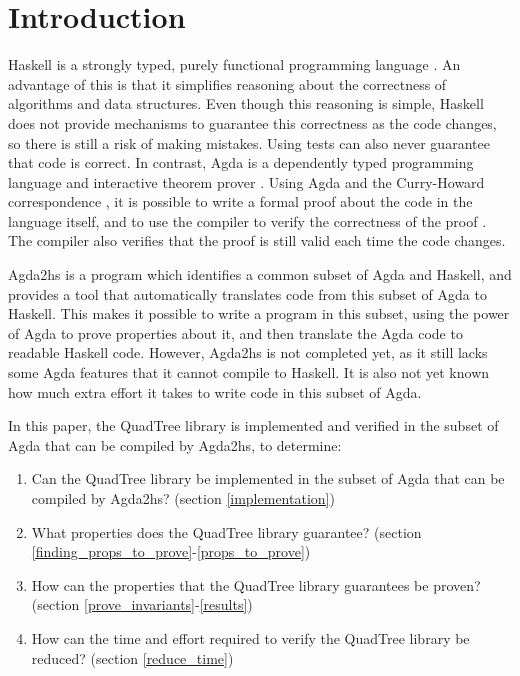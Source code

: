 \section{Introduction}
Haskell is a strongly typed, purely functional programming language \cite{haskell}. An advantage of this is that it simplifies reasoning about the correctness of algorithms and data structures. Even though this reasoning is simple, Haskell does not provide mechanisms to guarantee this correctness as the code changes, so there is still a risk of making mistakes. Using tests can also never guarantee that code is correct. In contrast, Agda is a dependently typed programming language and interactive theorem prover \cite{agda}. Using Agda and the Curry-Howard correspondence \cite{chc}, it is possible to write a formal proof about the code in the language itself, and to use the compiler to verify the correctness of the proof \cite{schwaab, van}. The compiler also verifies that the proof is still valid each time the code changes.

Agda2hs \cite{agda2hs} is a program which identifies a common subset of Agda and Haskell, and provides a tool that automatically translates code from this subset of Agda to Haskell. This makes it possible to write a program in this subset, using the power of Agda to prove properties about it, and then translate the Agda code to readable Haskell code. However, Agda2hs is not completed yet, as it still lacks some Agda features that it cannot compile to Haskell. It is also not yet known how much extra effort it takes to write code in this subset of Agda.

In this paper, the QuadTree library is implemented and verified in the subset of Agda that can be compiled by Agda2hs, to determine:
\begin{enumerate}[label=(\roman*)]
	\itemsep-0.2em 
	\item Can the QuadTree library be implemented in the subset of Agda that can be compiled by Agda2hs? (section \ref{implementation})
	\item What properties does the QuadTree library guarantee? (section \ref{finding_props_to_prove}-\ref{props_to_prove})
	\item How can the properties that the QuadTree library guarantees be proven? (section \ref{prove_invariants}-\ref{results})
	\item How can the time and effort required to verify the QuadTree library be reduced? (section \ref{reduce_time})
\end{enumerate}
